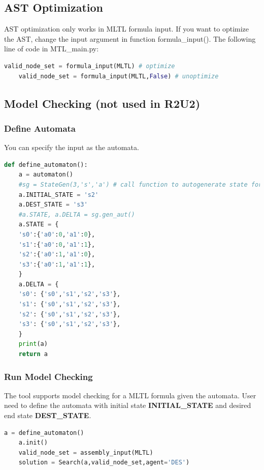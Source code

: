 \subsection{AST Optimization}
AST optimization only works in MLTL formula input. If you want to optimize the AST, change the input argument in function \colorbox{blue!30}{formula\_input()}. The following line of code in MTL\_main.py:
\begin{lstlisting}[language=Python]
	valid_node_set = formula_input(MLTL) # optimize
	valid_node_set = formula_input(MLTL,False) # unoptimize
\end{lstlisting}

\subsection{Model Checking (not used in R2U2)}
\subsubsection{Define Automata} \label{sec:aut}
You can specify the input as the automata.
\begin{lstlisting}[language=Python]
def define_automaton():
	a = automaton()
	#sg = StateGen(3,'s','a') # call function to autogenerate state for you
	a.INITIAL_STATE = 's2'
	a.DEST_STATE = 's3'
	#a.STATE, a.DELTA = sg.gen_aut()
	a.STATE = {
	's0':{'a0':0,'a1':0},
	's1':{'a0':0,'a1':1},
	's2':{'a0':1,'a1':0},
	's3':{'a0':1,'a1':1},
	}
	a.DELTA = {
	's0': {'s0','s1','s2','s3'},
	's1': {'s0','s1','s2','s3'},
	's2': {'s0','s1','s2','s3'},
	's3': {'s0','s1','s2','s3'},
	}
	print(a)
	return a
\end{lstlisting}

\subsubsection{Run Model Checking}
The tool supports model checking for a MLTL formula given the automata. User need to define the automata with initial state \textbf{INITIAL\_STATE} and desired end state \textbf{DEST\_STATE}.
\begin{lstlisting}[language=Python]
	a = define_automaton()
	a.init()
	valid_node_set = assembly_input(MLTL)
	solution = Search(a,valid_node_set,agent='DES')
\end{lstlisting}
\clearpage
